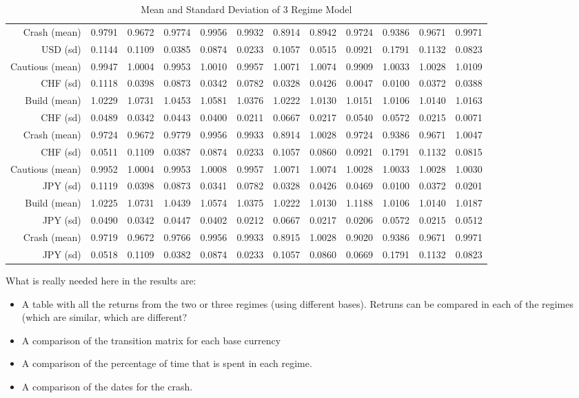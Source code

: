 \documentclass[12pt, a4paper, oneside]{article} %
\begin{document}
\begin{landscape}
\begin{table}[ht]
\begin{tabular}{rrrrrrrrrrrr}
Crash (mean) & 0.9791 & 0.9672 & 0.9774 & 0.9956 & 0.9932 & 0.8914 & 0.8942 & 0.9724 & 0.9386 & 0.9671 & 0.9971 \\ 
USD (sd) & 0.1144 & 0.1109 & 0.0385 & 0.0874 & 0.0233 & 0.1057 & 0.0515 & 0.0921 & 0.1791 & 0.1132 & 0.0823 \\ 
\hline
Cautious (mean) & 0.9947 & 1.0004 & 0.9953 & 1.0010 & 0.9957 & 1.0071 & 1.0074 & 0.9909 & 1.0033 & 1.0028 & 1.0109 \\ 
CHF (sd) & 0.1118 & 0.0398 & 0.0873 & 0.0342 & 0.0782 & 0.0328 & 0.0426 & 0.0047 & 0.0100 & 0.0372 & 0.0388 \\ 
Build (mean) & 1.0229 & 1.0731 & 1.0453 & 1.0581 & 1.0376 & 1.0222 & 1.0130 & 1.0151 & 1.0106 & 1.0140 & 1.0163 \\ 
CHF (sd) & 0.0489 & 0.0342 & 0.0443 & 0.0400 & 0.0211 & 0.0667 & 0.0217 & 0.0540 & 0.0572 & 0.0215 & 0.0071 \\ 
Crash (mean) & 0.9724 & 0.9672 & 0.9779 & 0.9956 & 0.9933 & 0.8914 & 1.0028 & 0.9724 & 0.9386 & 0.9671 & 1.0047 \\ 
CHF (sd) & 0.0511 & 0.1109 & 0.0387 & 0.0874 & 0.0233 & 0.1057 & 0.0860 & 0.0921 & 0.1791 & 0.1132 & 0.0815 \\ 
\hline
Cautious (mean)& 0.9952 & 1.0004 & 0.9953 & 1.0008 & 0.9957 & 1.0071 & 1.0074 & 1.0028 & 1.0033 & 1.0028 & 1.0030 \\ 
JPY (sd) & 0.1119 & 0.0398 & 0.0873 & 0.0341 & 0.0782 & 0.0328 & 0.0426 & 0.0469 & 0.0100 & 0.0372 & 0.0201 \\ 
Build (mean) & 1.0225 & 1.0731 & 1.0439 & 1.0574 & 1.0375 & 1.0222 & 1.0130 & 1.1188 & 1.0106 & 1.0140 & 1.0187 \\ 
JPY (sd) & 0.0490 & 0.0342 & 0.0447 & 0.0402 & 0.0212 & 0.0667 & 0.0217 & 0.0206 & 0.0572 & 0.0215 & 0.0512 \\ 
Crash (mean) & 0.9719 & 0.9672 & 0.9766 & 0.9956 & 0.9933 & 0.8915 & 1.0028 & 0.9020 & 0.9386 & 0.9671 & 0.9971 \\ 
JPY (sd) & 0.0518 & 0.1109 & 0.0382 & 0.0874 & 0.0233 & 0.1057 & 0.0860 & 0.0669 & 0.1791 & 0.1132 & 0.0823 \\ 
   \hline
\end{tabular}
\caption{Mean and Standard Deviation of 3 Regime Model}
\label{tabref:3StateProb}
\end{table}
\end{landscape}

What is really needed here in the results are:
\begin{itemize}
\item A table with all the returns from the two or three regimes (using different bases).  Retruns can be compared in each of the regimes (which are similar, which are different? 
\item A comparison of the transition matrix for each base currency
\item A comparison of the percentage of time that is spent in each regime. 
\item A comparison of the dates for the crash. 
\end{itemize}
 
\end{document}
